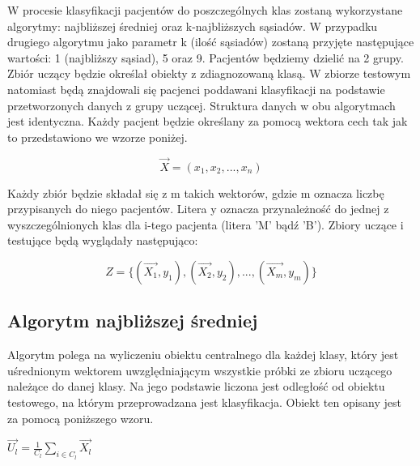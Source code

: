 \documentclass[12pt]{article}
\begin{document}
\indent W procesie klasyfikacji pacjentów do poszczególnych klas zostaną wykorzystane algorytmy: najbliższej średniej oraz k-najbliższych sąsiadów. W przypadku drugiego algorytmu jako parametr k (ilość sąsiadów) zostaną przyjęte następujące wartości: 1 (najbliższy sąsiad), 5 oraz 9. Pacjentów będziemy dzielić na 2 grupy. Zbiór uczący będzie określał obiekty z zdiagnozowaną klasą. W zbiorze testowym natomiast będą znajdowali się pacjenci poddawani klasyfikacji na podstawie przetworzonych danych z grupy uczącej. Struktura danych w obu algorytmach jest identyczna. Każdy pacjent będzie określany za pomocą wektora cech tak jak to przedstawiono we wzorze poniżej.
\begin{center}
\[ \vec{X} = (x_1, x_2, ... , x_n)\]
\end{center}


Każdy zbiór będzie składał się z m takich wektorów, gdzie m oznacza liczbę przypisanych do niego pacjentów. Litera y oznacza przynależność do jednej z wyszczególnionych klas dla i-tego pacjenta (litera 'M' bądź 'B').
Zbiory uczące i testujące będą wyglądały następująco:
\begin{center}
\[ Z=\{(\vec{X_{1}}, y_{1}), (\vec{X_{2}}, y_{2}), ... , (\vec{X_{m}}, y_{m})\}\]
\end{center}

\subsection{Algorytm najbliższej średniej}
\indent Algorytm polega na wyliczeniu obiektu centralnego dla każdej klasy, który jest uśrednionym wektorem uwzględniającym wszystkie próbki ze zbioru uczącego należące do danej klasy. Na jego podstawie liczona jest odległość od obiektu testowego, na którym przeprowadzana jest klasyfikacja. Obiekt ten opisany jest za pomocą poniższego wzoru.
\begin{center}
$ \vec{U_{l}}=\frac{1}{C_{l}}\sum_{i\in{C_{l}}}\vec{X_{l}} $ \cite{bib1}
\end{center}
\end{document}
